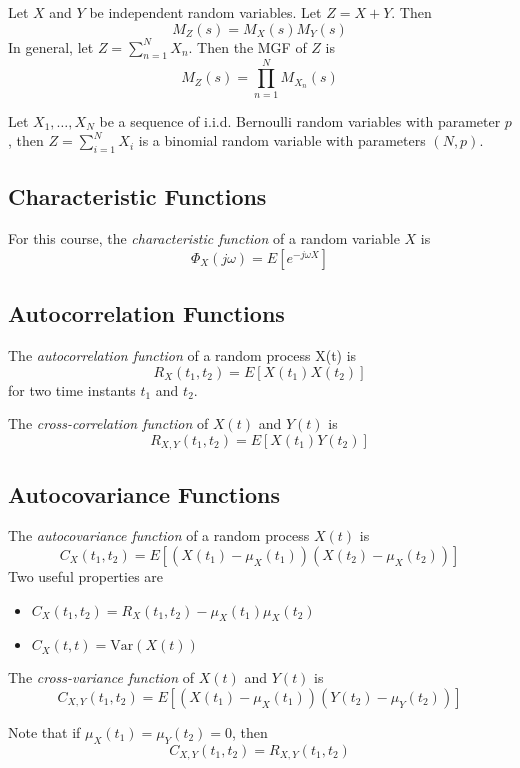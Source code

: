 Let $X$ and $Y$ be independent random variables.
Let $Z = X + Y$. Then
\begin{equation}
    M_Z(s) = M_X(s)M_Y(s)
\end{equation}
In general, let $Z = \sum_{n=1}^{N} X_n$. Then the
MGF of $Z$ is
\begin{equation}
    M_Z(s) = \prod_{n=1}^{N}M_{X_n}(s)
\end{equation}

Let $X_1, \dots, X_N$ be a sequence of i.i.d. Bernoulli
random variables with parameter $p$, then $Z = \sum_{i=1}^{N}X_i$
is a binomial random variable with parameters $(N, p)$.

\subsection{Characteristic Functions}
For this course, the \emph{characteristic function} of a
random variable $X$ is
\begin{equation}
    \Phi_X(j\omega) = E\left[e^{-j\omega X}\right]
\end{equation}

\subsection{Autocorrelation Functions}
The \emph{autocorrelation function} of a
random process X(t) is
\begin{equation}
    R_X(t_1, t_2) = E\left[X(t_1)X(t_2)\right]
\end{equation}
for two time instants $t_1$ and $t_2$.

The \emph{cross-correlation function}
of $X(t)$ and $Y(t)$ is
\begin{equation}
    R_{X,Y}(t_1, t_2) = E[X(t_1)Y(t_2)]
\end{equation}
\subsection{Autocovariance Functions}
The \emph{autocovariance function} of a random
process $X(t)$ is
\begin{equation}
    C_X(t_1, t_2) = E\left[(X(t_1)-\mu_X(t_1))(X(t_2)-\mu_X(t_2))\right]
\end{equation}
Two useful properties are
\begin{itemize}
    \item $C_X(t_1, t_2) = R_X(t_1,t_2) - \mu_X(t_1)\mu_X(t_2)$
    \item $C_X(t, t) = \text{Var}(X(t))$
\end{itemize}

The \emph{cross-variance function} of
$X(t)$ and $Y(t)$ is
\begin{equation}
    C_{X,Y}(t_1, t_2) = E\left[(X(t_1)-\mu_X(t_1))(Y(t_2) - \mu_Y(t_2))\right]
\end{equation}

Note that if $\mu_X(t_1) = \mu_Y(t_2) = 0$, then
\begin{equation}
    C_{X,Y}(t_1, t_2) = R_{X,Y}(t_1, t_2)
\end{equation}
